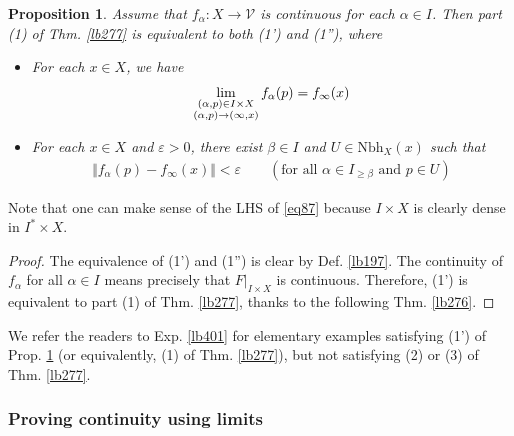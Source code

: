 \documentclass[12pt,b5paper,notitlepage]{article}
\theoremstyle{definition}
\theoremstyle{plain}
\newtheorem{pp}[df]{Proposition}
\newcommand{\mc}{\mathcal}
\newcommand{\Nbh}{\mathrm{Nbh}}
\newcommand{\eps}{\varepsilon}
\numberwithin{equation}{section}
\begin{document}
\begin{pp}\label{lb281}
Assume that $f_\alpha:X\rightarrow\mc V$ is continuous for each $\alpha\in I$. Then part (1) of Thm. \ref{lb277} is equivalent to both (1') and (1''), where
\begin{itemize}
\item[(1')] For each $x\in X$, we have 
\begin{align}\label{eq87}
\lim_{
\begin{subarray}{c}
(\alpha,p)\in I\times X\\
(\alpha,p)\rightarrow (\infty,x)
\end{subarray}
}
f_\alpha(p)=f_\infty(x)
\end{align}
\item[(1'')] For each $x\in X$ and $\eps>0$, there exist $\beta\in I$ and $U\in\Nbh_X(x)$ such that 
\begin{align}\label{eq79}
\Vert f_\alpha(p)-f_\infty(x)\Vert<\eps\qquad (\text{for all } \alpha\in I_{\geq\beta}\text{ and } p\in U)
\end{align}
\end{itemize}
\end{pp}

Note that one can make sense of the LHS of \eqref{eq87} because $I\times X$ is clearly dense in $I^*\times X$. %

\begin{proof}
The equivalence of (1') and (1'') is clear by Def. \ref{lb197}. The continuity of $f_\alpha$ for all $\alpha\in I$ means precisely that $F|_{I\times X}$ is continuous. Therefore, (1') is equivalent to part (1) of Thm. \ref{lb277}, thanks to the following Thm. \ref{lb276}.
\end{proof}


We refer the readers to Exp. \ref{lb401} for elementary examples satisfying (1') of Prop. \ref{lb281} (or equivalently, (1) of Thm. \ref{lb277}), but not satisfying (2) or (3) of Thm. \ref{lb277}.


\subsubsection{Proving continuity using limits}
\end{document}
